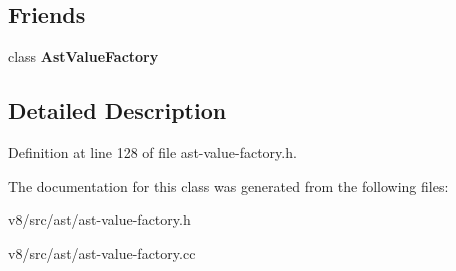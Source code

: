 \subsection*{Friends}
\begin{DoxyCompactItemize}
\item 
\mbox{\label{classv8_1_1internal_1_1AstConsString_a1d507e13f196677ce9bdd7b29efd96c0}} 
class {\bfseries Ast\+Value\+Factory}
\end{DoxyCompactItemize}


\subsection{Detailed Description}


Definition at line 128 of file ast-\/value-\/factory.\+h.



The documentation for this class was generated from the following files\+:\begin{DoxyCompactItemize}
\item 
v8/src/ast/ast-\/value-\/factory.\+h\item 
v8/src/ast/ast-\/value-\/factory.\+cc\end{DoxyCompactItemize}
